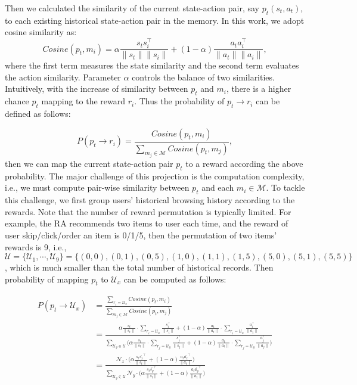 Then we calculated the similarity of the current state-action pair, say $p_t (s_t, a_t)$, to each existing historical state-action pair in the memory. In this work, we adopt cosine similarity as:
\begin{equation}\label{equ:cosine}
Cosine(p_t, m_i)=\alpha\frac{s_t s_i^\top}{ \| s_t \| \| s_i \|} + (1-\alpha)\frac{a_t a_i^\top}{ \| a_t \| \| a_i \|} ,
\end{equation}
where the first term measures the state similarity and the second term evaluates the action similarity. Parameter $\alpha$ controls the balance of two similarities. Intuitively, with the increase of similarity between $p_t$ and $m_i$, there is a higher chance $p_t$ mapping to the reward $r_i$. Thus the probability of $p_t \rightarrow r_i$ can be defined as follows:

\begin{equation}\label{equ:probability}
P(p_t \rightarrow r_i)=\frac{Cosine(p_t, m_i)}{\sum_{m_j \in \mathcal{M}}Cosine(p_t, m_j)}, 
\end{equation}
then we can map the current state-action pair $p_t$ to a reward according the above probability. The major challenge of this projection is the computation complexity, i.e., we must compute pair-wise similarity between $p_t$ and each $m_i \in \mathcal{M}$. To tackle this challenge, we first group users' historical browsing history according to the rewards. Note that the number of reward permutation is typically limited. For example, the RA recommends two items to user each time, and the reward of user skip/click/order an item is 0/1/5, then the permutation of two items' rewards is 9, i.e., $\mathcal{U}  = \{\mathcal{U}_1, \cdots, \mathcal{U}_9\}= \{(0,0), (0,1), (0,5), (1,0), (1,1), (1,5), (5,0), (5,1), (5,5)\}$, which is much smaller than the total number of historical records. Then probability of mapping $p_t$ to $\mathcal{U}_x$ can be computed as follows:
\begin{small}
\begin{equation}\label{equ:probability1}
\begin{aligned}
P(p_t \rightarrow \mathcal{U}_x) & =\frac{\sum_{r_i = \mathcal{U}_x}Cosine(p_t, m_i)}{\sum_{m_j \in \mathcal{M}}Cosine(p_t, m_j)}\\
&= \frac{\alpha \frac{s_t}{ \| s_t \|}\cdot \sum\limits_{r_i  = \mathcal{U}_x}\frac{s_i^\top}{\| s_i \|} + (1-\alpha) \frac{a_t}{ \| a_t \|}\cdot \sum\limits_{r_i  = \mathcal{U}_x}\frac{a_i^\top}{\| a_i \|}} {\sum\limits_{\mathcal{U}_y \in \mathcal{U}}\bigg(\alpha \frac{s_t}{ \| s_t \|}\cdot \sum\limits_{r_j  = \mathcal{U}_y}\frac{s_j^\top}{\| s_j \|} + (1-\alpha) \frac{a_t}{ \| a_t \|}\cdot \sum\limits_{r_j  = \mathcal{U}_y}\frac{a_j^\top}{\| a_j \|}\bigg)}\\
&=\frac{\mathcal{N}_x\cdot\bigg(\alpha \frac{s_t\bar{s_x}^\top}{ \| s_t \| } + (1-\alpha) \frac{a_t\bar{a_x}^\top}{ \| a_t \|}\bigg)} {\sum\limits_{\mathcal{U}_y \in \mathcal{U}}\mathcal{N}_y \cdot\bigg(\alpha \frac{s_t\bar{s_y}^\top}{ \| s_t \|} + (1-\alpha) \frac{a_t\bar{a_y}^\top }{ \| a_t \|}\bigg)}
\end{aligned}
\end{equation}
\end{small}
